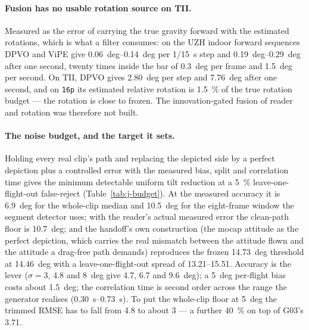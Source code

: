 \paragraph{Fusion has no usable rotation source on TII.} Measured as the error of carrying the
true gravity forward with the estimated rotations, which is what a filter consumes: on the UZH
indoor forward sequences DPVO and ViPE give \SIrange{0.06}{0.14}{deg} per \SI{1/15}{s} step and
\SIrange{0.19}{0.29}{deg} after one second, twenty times inside the bar of
\SI{0.3}{deg} per frame and \SI{1.5}{deg} per second. On TII, DPVO gives \SI{2.80}{deg} per step
and \SI{7.76}{deg} after one second, and on \texttt{16p} its estimated relative rotation is
\SI{1.5}{\percent} of the true rotation budget --- the rotation is close to frozen. The
innovation-gated fusion of reader and rotation was therefore not built.

\paragraph{The noise budget, and the target it sets.} Holding every real clip's path and replacing
the depicted side by a perfect depiction plus a controlled error with the measured bias, split and
correlation time gives the minimum detectable uniform tilt reduction at a \SI{5}{\percent}
leave-one-flight-out false-reject (Table~\ref{tab:j-budget}). At the measured accuracy it is
\SI{6.9}{deg} for the whole-clip median and \SI{10.5}{deg} for the eight-frame window the segment
detector uses; with the reader's actual measured error the clean-path floor is \SI{10.7}{deg}; and
the handoff's own construction (the mocap attitude as the perfect depiction, which carries the real
mismatch between the attitude flown and the attitude a drag-free path demands) reproduces the
frozen \SI{14.73}{deg} threshold at \SI{14.46}{deg} with a leave-one-flight-out spread of
\numrange{13.21}{15.51}. Accuracy is the lever ($\sigma=3$, \num{4.8} and \SI{8}{deg} give
\num{4.7}, \num{6.7} and \SI{9.6}{deg}); a \SI{5}{deg} per-flight bias costs about
\SI{1.5}{deg}; the correlation time is second order across the range the generator realises
(\SIrange{0.30}{0.73}{s}). To put the whole-clip floor at \SI{5}{deg} the trimmed RMSE has to fall
from \num{4.8} to about \num{3} --- a further \SI{40}{\percent} on top of G03's \num{3.71}.

